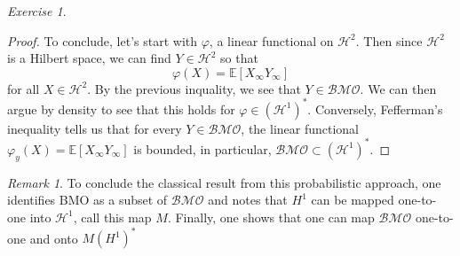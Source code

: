 \documentclass[11pt]{article}
\theoremstyle{remark}
\newtheorem{exr}{Exercise}
\newtheorem*{rmk}{Remark}
\newcommand{\calH}{\mathcal{H}}
\newcommand{\1}{\textbf{1}}
\newcommand{\bbE}{\mathbb{E}}
\begin{document}
\begin{exr}
\begin{proof}
To conclude, let's start with $\varphi$, a linear functional on $\calH^2$. Then since $\calH^2$ is a Hilbert space, we can find  $Y \in \calH^2$ so that
\[
\varphi(X) = \bbE[X_\infty Y_\infty]
\]
for all $X \in \calH^2$. By the previous inquality, we see that $Y \in \mathcal{BMO}$. We can then argue by density to see that this holds for $\varphi \in (\mathcal{H}^1)^*$. Conversely, Fefferman's inequality tells us that for every $Y \in \mathcal{BMO}$, the linear functional $\varphi_y(X) = \bbE[X_\infty Y_\infty]$ is bounded, in particular, $\mathcal{BMO} \subset (\mathcal{H}^1)^*$.
\end{proof}
\end{exr}
\begin{rmk}
To conclude the classical result from this probabilistic approach, one identifies BMO as a subset of $\mathcal{BMO}$ and notes that $H^1$ can be mapped one-to-one into $\mathcal{H}^1$, call this map $M$. Finally, one shows that one can map $\mathcal{BMO}$ one-to-one and onto $M(H^1)^*$
\end{rmk}
\end{document}
